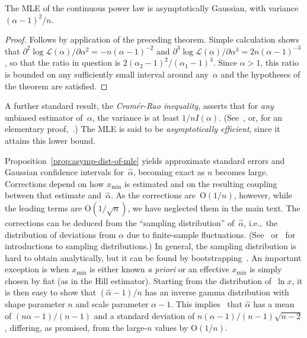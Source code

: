 \documentclass[final]{siamltex}
\newcommand{\defn}{\textit}
\newcommand{\Ord}{\mathrm{O}}
\newcommand{\xmin}{\ensuremath{x_{\min}}}
\newcommand{\Loglike}{\ensuremath{\mathcal{L}}}
\begin{document}
\begin{appendix}
\medbreak
\begin{proposition}
 The MLE of the continuous power law is asymptotically Gaussian, with
 variance ${(\alpha-1)}^2/n$.
\label{prop:asymp-dist-of-mle}
\end{proposition}
\begin{proof}
 Follows by application of the preceding theorem.  Simple calculation
 shows that $\partial^2 \log{\Loglike(\alpha)}/\partial \alpha^2 =
 -n{(\alpha - 1)}^{-2}$ and $\partial^3 \log{\Loglike(\alpha)}/\partial
 \alpha^3 = 2n{(\alpha - 1)}^{-3}$, so that the ratio in question is
 $2{(\alpha_2-1)}^2/{(\alpha_1 - 1)}^{3}$.  Since $\alpha > 1$, this ratio
 is bounded on any sufficiently small interval around any~$\alpha$ and the
 hypotheses of the theorem are satisfied.
\end{proof}

\medbreak
A further standard result, the \defn{Cram{\'e}r-Rao inequality}, asserts
that for \emph{any} unbiased estimator of~$\alpha$, the variance is at
least $1/nI(\alpha)$.  (See~\cite[\S 32.3]{Cramer}, or, for an elementary
proof,~\cite{Pitman-basic-theory}.)  The MLE is said to be
\defn{asymptotically efficient}, since it attains this lower bound.

Proposition~\ref{prop:asymp-dist-of-mle} yields approximate standard errors
and Gaussian confidence intervals for~$\hat{\alpha}$, becoming exact as $n$
becomes large.  Corrections depend on how $\xmin$ is estimated and on the
resulting coupling between that estimate and~$\hat{\alpha}$.  As the
corrections are~$\Ord(1/n)$, however, while the leading terms are
$\Ord(1/\sqrt{n})$, we have neglected them in the main text.  The
corrections can be deduced from the ``sampling distribution''
of~$\hat{\alpha}$, i.e.,~the distribution of deviations from $\alpha$ due
to finite-sample fluctuations.  (See~\cite{Cramer}
or~\cite{Wasserman-all-of-stats} for introductions to sampling
distributions.)  In general, the sampling distribution is hard to obtain
analytically, but it can be found by
bootstrapping~\cite{Wasserman-all-of-stats,Efron-Tibshirani-bootstrap}.  An
important exception is when $\xmin$ is either known \textit{a priori} or an
effective $\xmin$ is simply chosen by fiat (as in the Hill estimator).
Starting from the distribution of~$\ln{x}$, it is then easy to show that
$(\hat{\alpha}-1)/n$ has an inverse gamma distribution with shape parameter
$n$ and scale parameter $\alpha-1$.  This implies~\cite{JKB94} that
$\hat{\alpha}$ has a mean of $(n\alpha-1)/(n-1)$ and a standard deviation
of $n(\alpha-1)/(n-1)\sqrt{n-2}$, differing, as promised, from the
large-$n$ values by $\Ord(1/n)$.


\end{appendix}
\end{document}

